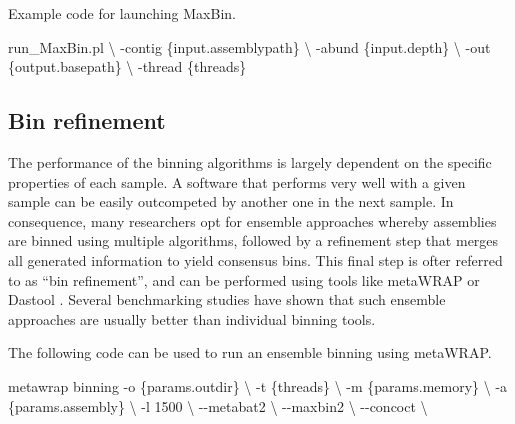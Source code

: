 \documentclass[
]{book}
\newenvironment{Shaded}{\begin{snugshade}}{\end{snugshade}}
\newcommand{\AttributeTok}[1]{\textcolor[rgb]{0.77,0.63,0.00}{#1}}
\newcommand{\DataTypeTok}[1]{\textcolor[rgb]{0.13,0.29,0.53}{#1}}
\newcommand{\ExtensionTok}[1]{#1}
\newcommand{\NormalTok}[1]{#1}
\begin{document}
\normalsize

Example code for launching MaxBin.
\small

\begin{Shaded}
\begin{Highlighting}[]
\ExtensionTok{run\_MaxBin.pl} \DataTypeTok{\textbackslash{}}
    \AttributeTok{{-}contig}\NormalTok{ \{input.assemblypath\} }\DataTypeTok{\textbackslash{}}
    \AttributeTok{{-}abund}\NormalTok{ \{input.depth\} }\DataTypeTok{\textbackslash{}}
    \AttributeTok{{-}out}\NormalTok{ \{output.basepath\} }\DataTypeTok{\textbackslash{}}
    \AttributeTok{{-}thread}\NormalTok{ \{threads\}}
\end{Highlighting}
\end{Shaded}

\normalsize

\hypertarget{genome-resolved-refinement}{%
\subsection*{Bin refinement}\label{genome-resolved-refinement}}

The performance of the binning algorithms is largely dependent on the specific properties of each sample. A software that performs very well with a given sample can be easily outcompeted by another one in the next sample. In consequence, many researchers opt for ensemble approaches whereby assemblies are binned using multiple algorithms, followed by a refinement step that merges all generated information to yield consensus bins. This final step is ofter referred to as ``bin refinement'', and can be performed using tools like metaWRAP \citep{Uritskiy2018-my} or Dastool \citep{Sieber2018-fp}. Several benchmarking studies have shown that such ensemble approaches are usually better than individual binning tools.

The following code can be used to run an ensemble binning using metaWRAP.
\small

\begin{Shaded}
\begin{Highlighting}[]
\ExtensionTok{metawrap}\NormalTok{ binning }\AttributeTok{{-}o}\NormalTok{ \{params.outdir\} }\DataTypeTok{\textbackslash{}}
    \AttributeTok{{-}t}\NormalTok{ \{threads\} }\DataTypeTok{\textbackslash{}}
    \AttributeTok{{-}m}\NormalTok{ \{params.memory\} }\DataTypeTok{\textbackslash{}}
    \AttributeTok{{-}a}\NormalTok{ \{params.assembly\} }\DataTypeTok{\textbackslash{}}
    \AttributeTok{{-}l}\NormalTok{ 1500 }\DataTypeTok{\textbackslash{}}
    \AttributeTok{{-}{-}metabat2} \DataTypeTok{\textbackslash{}}
    \AttributeTok{{-}{-}maxbin2} \DataTypeTok{\textbackslash{}}
    \AttributeTok{{-}{-}concoct} \DataTypeTok{\textbackslash{}}
\end{Highlighting}
\end{Shaded}
\end{document}
